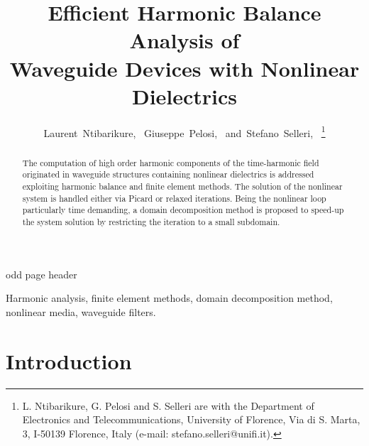 \documentclass[journal]{IEEEtran}
\begin{document}

%
\title{Efficient Harmonic Balance Analysis of \\ Waveguide Devices with Nonlinear Dielectrics}
%
%
\author{ Laurent~Ntibarikure,~
		Giuseppe~Pelosi,~
        and~Stefano~Selleri,~
        \thanks{ L. Ntibarikure, G. Pelosi and S. Selleri are with the
        Department of Electronics and Telecommunications, University of 
        Florence, Via di S. Marta, 3, I-50139 Florence, Italy (e-mail:
        stefano.selleri@unifi.it).} }
 
%
{odd page header}

\maketitle


\begin{abstract}
The computation of high order harmonic components of the
time-harmonic field originated in waveguide structures containing
nonlinear dielectrics is addressed exploiting 
harmonic balance and finite element methods. The solution
of the nonlinear system is handled either via Picard or relaxed iterations. 
Being the nonlinear loop particularly time demanding, a domain
decomposition method is proposed to speed-up the system solution by restricting
the iteration to a small subdomain.

\end{abstract}
\begin{IEEEkeywords}
Harmonic analysis, finite element methods, domain decomposition method,
nonlinear media, waveguide filters.
\end{IEEEkeywords}




\IEEEpeerreviewmaketitle



\section{Introduction}
\end{document}
